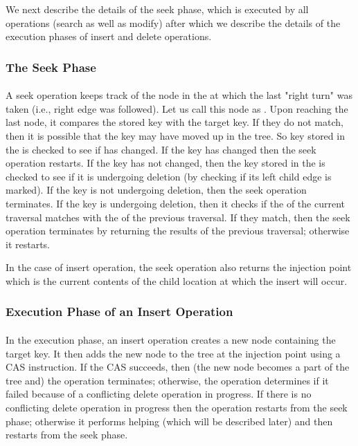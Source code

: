 We next describe the details of the seek phase, which is executed by all operations (search as well as modify) after which we describe the details of the execution phases of insert and delete operations.

\subsubsection{The Seek Phase} \paragraph{}



A seek operation keeps track of the node in the \accesspath \space at which the last "right turn" was taken (i.e., right edge was followed). Let us call this node as \anchorNode. Upon reaching the last node, it compares the stored key with the target key. If they do not match, then it is possible that the key may have moved up in the tree. So key stored in the \anchorNode \space is checked to see if has changed. If the key has changed then the seek operation restarts. If the key has not changed, then the key stored in the \anchorNode \space is checked to see if it is undergoing deletion (by checking if its left child edge is marked). If the key is not undergoing deletion, then the seek operation terminates. If the key is undergoing deletion, then it checks if the \anchorNode \space of the current traversal matches with the \anchorNode \space of the previous traversal. If they match, then the seek operation terminates by returning the results of the previous traversal; otherwise it restarts.\par
In the case of insert operation, the seek operation also returns the injection point which is the current contents of the child location at which the insert will occur.

\subsubsection{Execution Phase of an Insert Operation} \paragraph{}

In the execution phase, an insert operation creates a new node containing the target key. It then adds the new node to the tree at the injection point using a CAS instruction. If the CAS succeeds, then (the new node becomes a part of the tree and) the operation terminates; otherwise, the operation determines if it failed because of a conflicting delete operation in progress. If there is no conflicting delete operation in progress then the operation restarts from the seek phase; otherwise it performs helping (which will be described later) and then restarts from the seek phase.

